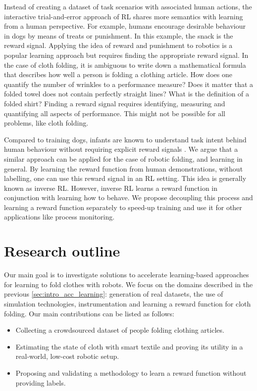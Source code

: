 \documentclass[\home/main.tex]{subfiles}
\begin{document}
Instead of creating a dataset of task scenarios with associated human actions, the interactive trial-and-error approach of \gls{RL} shares more semantics with learning from a human perspective. For example, humans encourage desirable behaviour in dogs by means of treats or punishment. In this example, the snack is the reward signal. Applying the idea of reward and punishment to robotics is a popular learning approach but requires finding the appropriate reward signal. In the case of cloth folding, it is ambiguous to write down a mathematical formula that describes how well a person is folding a clothing article. How does one quantify the number of wrinkles to a performance measure? Does it matter that a folded towel does not contain perfectly straight lines? What is the definition of a folded shirt? Finding a reward signal requires identifying, measuring and quantifying all aspects of performance. This might not be possible for all problems, like cloth folding.

Compared to training dogs, infants are known to understand task intent behind human behaviour without requiring explicit reward signals \autocite{warneken2006altruistic}.
We argue that a similar approach can be applied for the case of robotic folding, and learning in general. By learning the reward function from human demonstrations, without labelling, one can use this reward signal in an \gls{RL} setting. This idea is generally known as inverse \gls{RL}. However, inverse RL learns a reward function in conjunction with learning how to behave. We propose decoupling this process and learning a reward function separately to speed-up training and use it for other applications like process monitoring.

\section{Research outline}
Our main goal is to investigate solutions to accelerate learning-based approaches for learning to fold clothes with robots. We focus on the domains described in the previous \cref{sec:intro_acc_learning}: generation of real datasets, the use of simulation technologies, instrumentation and learning a reward function for cloth folding. Our main contributions can be listed as follows:
\begin{itemize}
    \item Collecting a crowdsourced dataset of people folding clothing articles.
    \item Estimating the state of cloth with smart textile and proving its utility in a real-world, low-cost robotic setup.
    \item Proposing and validating a methodology to learn a reward function without providing labels.
\end{itemize}
\end{document}
